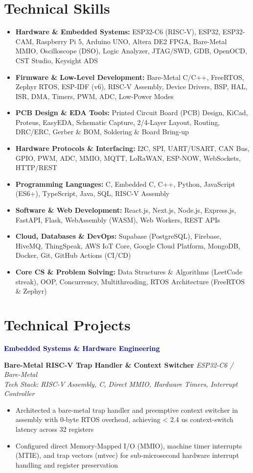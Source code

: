 \documentclass[a4paper,10pt]{article}
\newcommand{\resumeItem}[1]{\item #1}
\newenvironment{resumeItemize}{\begin{itemize}[leftmargin=*, itemsep=0.5pt, topsep=0.8pt]}{\end{itemize}}
\newcommand{\resumeProject}[3]{
  \textbf{#1} \hfill \textit{#2} \\
  \textit{Tech Stack: #3}
}
\newcommand{\resumeSubSection}[1]{%
  \vspace{3pt}%
  \noindent\textbf{\textcolor{darkblue}{#1}}\par\vspace{1.5pt}%
}
\begin{document}
\section*{Technical Skills}
\begin{resumeItemize}
    \resumeItem{\textbf{Hardware \& Embedded Systems:} ESP32-C6 (RISC-V), ESP32, ESP32-CAM, Raspberry Pi 5, Arduino UNO, Altera DE2 FPGA, Bare-Metal MMIO, Oscilloscope (DSO), Logic Analyzer, JTAG/SWD, GDB, OpenOCD, CST Studio, Keysight ADS}
    \resumeItem{\textbf{Firmware \& Low-Level Development:} Bare-Metal C/C++, FreeRTOS, Zephyr RTOS, ESP-IDF (v6), RISC-V Assembly, Device Drivers, BSP, HAL, ISR, DMA, Timers, PWM, ADC, Low-Power Modes}
    \resumeItem{\textbf{PCB Design \& EDA Tools:} Printed Circuit Board (PCB) Design, KiCad, Proteus, EasyEDA, Schematic Capture, 2/4-Layer Layout, Routing, DRC/ERC, Gerber \& BOM, Soldering \& Board Bring-up}
    \resumeItem{\textbf{Hardware Protocols \& Interfacing:} I2C, SPI, UART/USART, CAN Bus, GPIO, PWM, ADC, MMIO, MQTT, LoRaWAN, ESP-NOW, WebSockets, HTTP/REST}
    \resumeItem{\textbf{Programming Languages:} C, Embedded C, C++, Python, JavaScript (ES6+), TypeScript, Java, SQL, RISC-V Assembly}
    \resumeItem{\textbf{Software \& Web Development:} React.js, Next.js, Node.js, Express.js, FastAPI, Flask, WebAssembly (WASM), Web Workers, REST APIs}
    \resumeItem{\textbf{Cloud, Databases \& DevOps:} Supabase (PostgreSQL), Firebase, HiveMQ, ThingSpeak, AWS IoT Core, Google Cloud Platform, MongoDB, Docker, Git, GitHub Actions (CI/CD)}
    \resumeItem{\textbf{Core CS \& Problem Solving:} Data Structures \& Algorithms (LeetCode streak), OOP, Concurrency, Multithreading, RTOS Architecture (FreeRTOS \& Zephyr)}
\end{resumeItemize}

\section*{Technical Projects}

\resumeSubSection{Embedded Systems \& Hardware Engineering}
\resumeProject{Bare-Metal RISC-V Trap Handler \& Context Switcher}{ESP32-C6 / Bare-Metal}{RISC-V Assembly, C, Direct MMIO, Hardware Timers, Interrupt Controller}
\begin{resumeItemize}
    \resumeItem{Architected a bare-metal trap handler and preemptive context switcher in assembly with 0-byte RTOS overhead, achieving < 2.4 us context-switch latency across 32 registers}
    \resumeItem{Configured direct Memory-Mapped I/O (MMIO), machine timer interrupts (MTIE), and trap vectors (mtvec) for sub-microsecond hardware interrupt handling and register preservation}
\end{resumeItemize}
\vspace{1.6pt}
\end{document}
